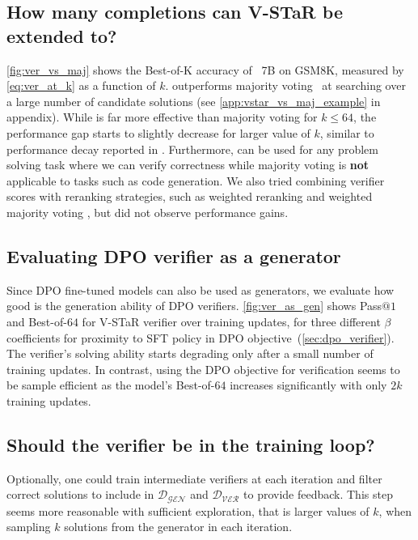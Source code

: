 \subsection{How many completions can V-STaR be extended to?}
\autoref{fig:ver_vs_maj} shows the Best-of-K accuracy of \vstar{}~7B on GSM8K, measured by \autoref{eq:ver_at_k} as a function of $k$. 
\vstar{} outperforms majority voting~\citep{DBLP:conf/iclr/0002WSLCNCZ23} at searching over a large number of candidate solutions (see \autoref{app:vstar_vs_maj_example} in appendix). While \vstar{} is far more effective than majority voting for $k\leq64$, the performance gap starts to slightly decrease for larger value of $k$, similar to performance decay reported in \citet{DBLP:journals/corr/abs-2110-14168}. Furthermore, \vstar{} can be used for any problem solving task where we can verify correctness while majority voting is \textbf{not} applicable to tasks such as code generation. We also tried combining verifier scores with reranking strategies, such as weighted reranking and weighted majority voting \cite{DBLP:journals/corr/abs-2310-10047}, but did not observe performance gains.

\subsection{Evaluating DPO verifier as a generator}
\label{sec:dpo_ver_vs_gen}
Since DPO fine-tuned models can also be used as generators, we evaluate how good is the generation ability of DPO verifiers. \autoref{fig:ver_as_gen} shows Pass$@1$ and Best-of-$64$ for V-STaR verifier over training updates, for three different $\beta$ coefficients for proximity to SFT policy in DPO objective~(\autoref{sec:dpo_verifier}). The verifier's solving ability starts degrading only after a small number of training updates. In contrast, using the DPO objective for verification seems to be sample efficient as the model's Best-of-$64$ increases significantly with only $2k$ training updates.

\subsection{Should the verifier be in the training 
loop?}
Optionally, one could train intermediate verifiers at each iteration and filter correct solutions to include in $\mathcal{D_\text{GEN}}$ and $\mathcal{D_\text{VER}}$ to provide feedback. This step seems more reasonable with sufficient exploration, that is larger values of $k$, when sampling $k$ solutions from the generator in each iteration.

